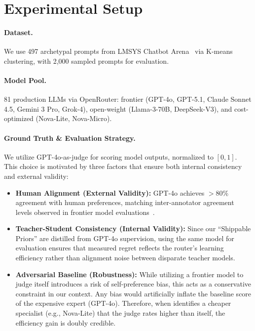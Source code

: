 
\section{Experimental Setup}
\label{sec:experiments}

\paragraph{Dataset.} We use 497 archetypal prompts from LMSYS Chatbot Arena~\cite{zheng2023judging} via K-means clustering, with 2,000 sampled prompts for evaluation.

\paragraph{Model Pool.} 81 production LLMs via OpenRouter: frontier (GPT-4o, GPT-5.1, Claude Sonnet 4.5, Gemini 3 Pro, Grok-4), open-weight (Llama-3-70B, DeepSeek-V3), and cost-optimized (Nova-Lite, Nova-Micro).

\paragraph{Ground Truth \& Evaluation Strategy.} We utilize GPT-4o-as-judge for scoring model outputs, normalized to $[0,1]$. This choice is motivated by three factors that ensure both internal consistency and external validity:

\begin{itemize}[leftmargin=*,nosep]
    \item \textbf{Human Alignment (External Validity):} GPT-4o achieves $>$80\% agreement with human preferences, matching inter-annotator agreement levels observed in frontier model evaluations~\cite{zheng2023judging}.
    
    \item \textbf{Teacher-Student Consistency (Internal Validity):} Since our ``Shippable Priors'' are distilled from GPT-4o supervision, using the same model for evaluation ensures that measured regret reflects the router's learning efficiency rather than alignment noise between disparate teacher models.
    
    \item \textbf{Adversarial Baseline (Robustness):} While utilizing a frontier model to judge itself introduces a risk of self-preference bias, this acts as a conservative constraint in our context. Any bias would artificially inflate the baseline score of the expensive expert (GPT-4o). Therefore, when \ours{} identifies a cheaper specialist (e.g., Nova-Lite) that the judge rates higher than itself, the efficiency gain is doubly credible.
\end{itemize}

